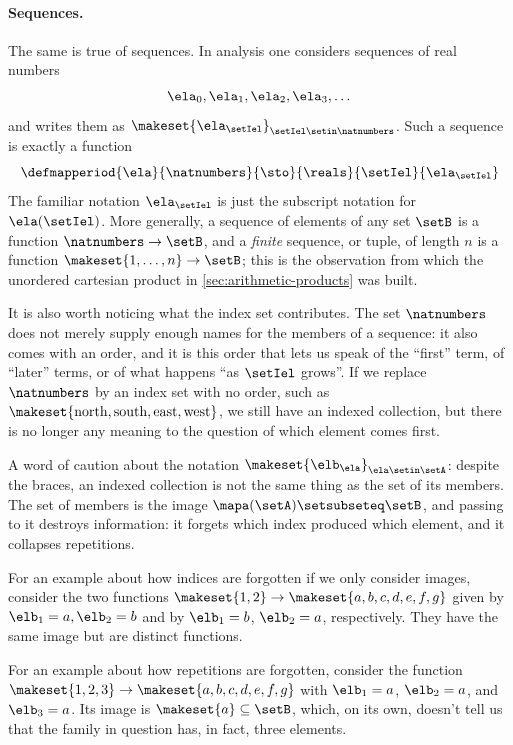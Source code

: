 \paragraph{Sequences.}
The same is true of sequences. In analysis one considers sequences of real numbers
\begin{equation}
\ela_0, \ela_1, \ela_2, \ela_3, \dots
\end{equation}
and writes them as $\makeset{ \ela_\setIel }_{\setIel \setin \natnumbers}$. Such a sequence is exactly a function
\begin{equation}
\defmapperiod{
    \ela
}{
    \natnumbers
}{
    \sto
}{
    \reals
}{
    \setIel
}{
    \ela_\setIel
}
\end{equation}
The familiar notation $\ela_\setIel$ is just the subscript notation for $\ela(\setIel)$. More generally, a sequence of elements of any set $\setB$ is a function $\natnumbers \to \setB$, and a \emph{finite} sequence, or tuple, of length $n$ is a function $\makeset{1, \dots, n} \to \setB$; this is the observation from which the unordered cartesian product in \cref{sec:arithmetic-products} was built.

It is also worth noticing what the index set contributes. The set $\natnumbers$ does not merely supply enough names for the members of a sequence: it also comes with an order, and it is this order that lets us speak of the ``first'' term, of ``later'' terms, or of what happens ``as $\setIel$ grows''. If we replace $\natnumbers$ by an index set with no order, such as $\makeset{\text{north}, \text{south}, \text{east}, \text{west}}$, we still have an indexed collection, but there is no longer any meaning to the question of which element comes first.

\begin{remark}
    A word of caution about the notation $\makeset{ \elb_\ela }_{\ela \setin \setA}$: despite the braces, an indexed collection is not the same thing as the set of its members. The set of members is the image $\mapa(\setA) \setsubseteq \setB$, and passing to it destroys information: it forgets which index produced which element, and it collapses repetitions. 
    
    
For an example about how indices are forgotten if we only consider images, consider the two functions $\makeset{1,2} \to \makeset{a, b, c, d, e, f, g}$ given by $\elb_1 = a,  \elb_2 = b$ and by $\elb_1 = b$, $\elb_2 = a$, respectively. They have the same image but are distinct functions.  

For an example about how repetitions are forgotten, consider the function $\makeset{1,2, 3} \to \makeset{a, b, c, d, e, f, g}$ with $\elb_1 = a$, $\elb_2 = a$, and $\elb_3 = a$. Its image is $\makeset{a} \subseteq \setB$, which, on its own, doesn't tell us that the family in question has, in fact, three elements. 
\end{remark}

